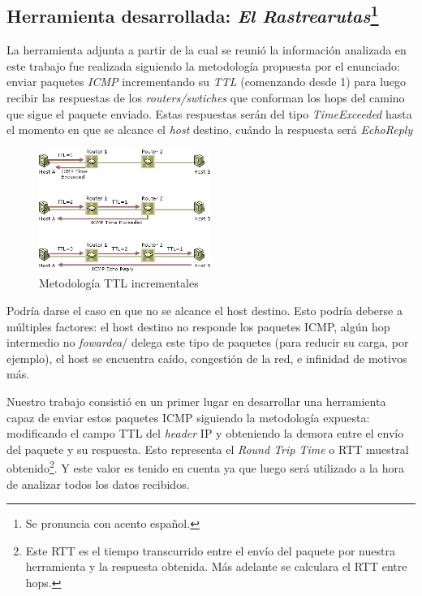 \subsection*{Herramienta desarrollada: \textit{El Rastrearutas}\footnote{Se
pronuncia con acento espa\~nol.}}\label{sec:traceroute}
\par La herramienta adjunta a partir de la cual se reuni\'o la informaci\'on
analizada en este trabajo fue realizada siguiendo la metodolog\'ia propuesta
por el enunciado: enviar paquetes \textit{ICMP}\cite{rfc792} incrementando
su \textit{TTL} (comenzando desde 1) para luego recibir las respuestas de los
\textit{routers/swtiches} que conforman los hops del camino que sigue el paquete
enviado. Estas respuestas ser\'an del tipo \textit{TimeExceeded} hasta el
momento en que se alcance el \textit{host} destino, cu\'ando la respuesta ser\'a
\textit{EchoReply}

\begin{figure}[hbt]
	\centering
	\includegraphics[width=0.5\textwidth,
			]{img/introduccion/rastrearutas.png}
	\caption{Metodolog\'ia TTL incrementales}
	\label{fig:metodologia_rastrearutas}
\end{figure}

\par Podr\'ia darse el caso en que no se alcance el
host destino. Esto podr\'ia deberse a m\'ultiples factores: el host destino
no responde los paquetes ICMP, alg\'un hop intermedio no \textit{fowardea}/%
delega este tipo de paquetes (para reducir su carga, por ejemplo), el host
se encuentra ca\'ido, congesti\'on de la red, e infinidad de motivos m\'as.

\par Nuestro trabajo consisti\'o en un primer lugar en desarrollar una
herramienta capaz de enviar estos paquetes ICMP siguiendo la metodolog\'ia
expuesta: modificando el campo TTL del \textit{header} IP y obteniendo la demora
entre el env\'io del paquete y su respuesta. Esto representa el \textit{Round
Trip Time} o RTT muestral obtenido\footnote{Este RTT es el tiempo transcurrido
entre el env\'io del paquete por nuestra herramienta y la respuesta obtenida.
M\'as adelante se calculara el RTT entre hops.}. Y este valor es tenido en
cuenta ya que luego ser\'a utilizado a la hora de analizar todos los datos
recibidos.


